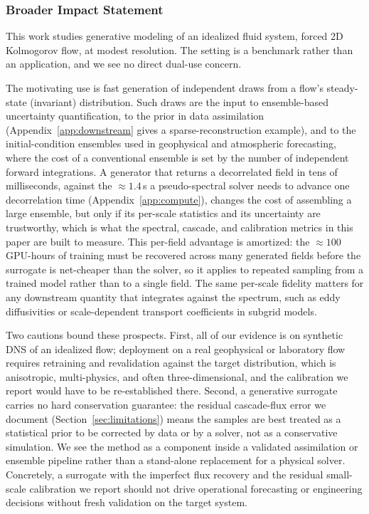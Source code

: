 \documentclass[10pt]{article} %
\begin{document}
\subsubsection*{Broader Impact Statement}

This work studies generative modeling of an idealized fluid system, forced 2D Kolmogorov flow, at modest resolution. The setting is a benchmark rather than an application, and we see no direct dual-use concern.

The motivating use is fast generation of independent draws from a flow's steady-state (invariant) distribution. Such draws are the input to ensemble-based uncertainty quantification, to the prior in data assimilation (Appendix~\ref{app:downstream} gives a sparse-reconstruction example), and to the initial-condition ensembles used in geophysical and atmospheric forecasting, where the cost of a conventional ensemble is set by the number of independent forward integrations. A generator that returns a decorrelated field in tens of milliseconds, against the $\approx 1.4$\,s a pseudo-spectral solver needs to advance one decorrelation time (Appendix~\ref{app:compute}), changes the cost of assembling a large ensemble, but only if its per-scale statistics and its uncertainty are trustworthy, which is what the spectral, cascade, and calibration metrics in this paper are built to measure. This per-field advantage is amortized: the $\approx 100$ GPU-hours of training must be recovered across many generated fields before the surrogate is net-cheaper than the solver, so it applies to repeated sampling from a trained model rather than to a single field. The same per-scale fidelity matters for any downstream quantity that integrates against the spectrum, such as eddy diffusivities or scale-dependent transport coefficients in subgrid models.

Two cautions bound these prospects. First, all of our evidence is on synthetic DNS of an idealized flow; deployment on a real geophysical or laboratory flow requires retraining and revalidation against the target distribution, which is anisotropic, multi-physics, and often three-dimensional, and the calibration we report would have to be re-established there. Second, a generative surrogate carries no hard conservation guarantee: the residual cascade-flux error we document (Section~\ref{sec:limitations}) means the samples are best treated as a statistical prior to be corrected by data or by a solver, not as a conservative simulation. We see the method as a component inside a validated assimilation or ensemble pipeline rather than a stand-alone replacement for a physical solver. Concretely, a surrogate with the imperfect flux recovery and the residual small-scale calibration we report should not drive operational forecasting or engineering decisions without fresh validation on the target system.
\end{document}
